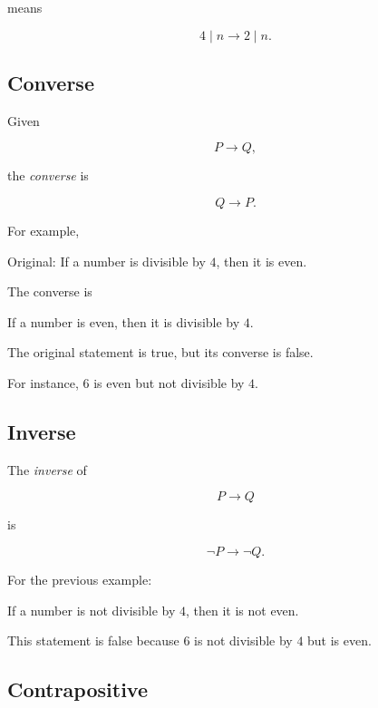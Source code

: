 means

\[ 4\mid n\to 2\mid n. \]

\subsection{Converse}
\label{subsec:converse}

Given

\[ P\to Q, \]

the \emph{converse} is

\[ Q\to P. \]

For example,

\begin{center}
Original: If a number is divisible by \(4\), then it is even.
\end{center}

The converse is

\begin{center}
If a number is even, then it is divisible by \(4\).
\end{center}

The original statement is true, but its converse is false.

For instance, \(6\) is even but not divisible by \(4\).

\subsection{Inverse}
\label{subsec:logical-inverse}

The \emph{inverse} of

\[ P\to Q \]

is

\[ \neg P\to\neg Q. \]

For the previous example:

\begin{center}
If a number is not divisible by \(4\), then it is not even.
\end{center}

This statement is false because \(6\) is not divisible by \(4\) but is even.

\subsection{Contrapositive}
\label{subsec:contrapositive}

